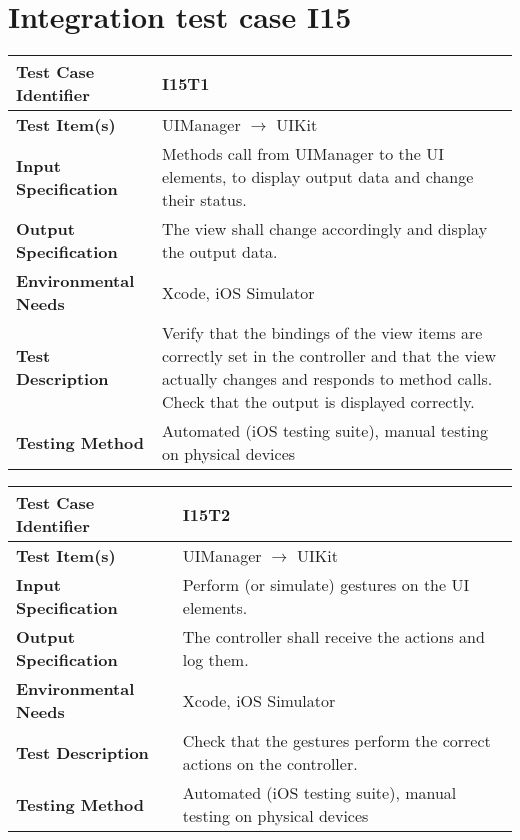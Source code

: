 \vspace{2em}


\section{Integration test case I15}

\begin{tabular}{l p{}}
    \hline
    \textbf{Test Case Identifier} & I15T1\\
    \hline
    \textbf{Test Item(s)} & UIManager $\rightarrow$ UIKit \\
    \hline
    \textbf{Input Specification} & Methods call from UIManager to the UI elements, to display output data and change their status.\\
    \hline
    \textbf{Output Specification} & The view shall change accordingly and display the output data.\\
    \hline
    \textbf{Environmental Needs} & Xcode, iOS Simulator\\
    \hline
    \textbf{Test Description} & Verify that the bindings of the view items are correctly set in the controller and that the view actually changes and responds to method calls. Check that the output is displayed correctly.\\
    \hline
    \textbf{Testing Method} & Automated (iOS testing suite), manual testing on physical devices \\
    \hline
\end{tabular}

\vspace{2em}

\noindent\begin{tabular}{l p{}}
    \hline
    \textbf{Test Case Identifier} & I15T2\\
    \hline
    \textbf{Test Item(s)} & UIManager $\rightarrow$ UIKit \\
    \hline
    \textbf{Input Specification} & Perform (or simulate) gestures on the UI elements.\\
    \hline
    \textbf{Output Specification} & The controller shall receive the actions and log them. \\
    \hline
    \textbf{Environmental Needs} & Xcode, iOS Simulator\\
    \hline
    \textbf{Test Description} & Check that the gestures perform the correct actions on the controller.\\
    \hline
    \textbf{Testing Method} & Automated (iOS testing suite), manual testing on physical devices \\
    \hline
\end{tabular}

